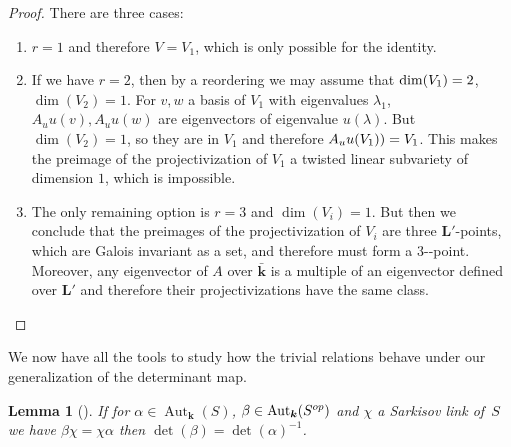 \documentclass[10pt,a4paper]{amsart}
\providecommand{\nobreakdash}{\nobreak\hbox{-}}
\newcommand{\op}{\textup{op}}
\newtheorem{lemma}[theorem]{Lemma}
\theoremstyle{definition}
\newcommand{\kk}{{\boldsymbol{k}}}
\newcommand{\LL}{{\boldsymbol{L}}}
\DeclareMathOperator{\Aut}{Aut}
\begin{document}
\begin{proof}
There are three cases:
\begin{enumerate}
\item $r = 1$ and therefore $V = V_1$, which is only possible for the identity.
\item If we have $r=2$, then by a reordering we may assume that $\dim(V_1) =\nobreak 2$, $\dim(V_2) = 1$. For $v, w$ a basis of $V_1$ with eigenvalues $\lambda_1$, $A_u u(v), A_u u(w)$
are eigenvectors of eigenvalue $u(\lambda)$. But $\dim(V_2) = 1$, so they are in $V_1$ and therefore $A_uu(V_1)) =\nobreak V_1$. This makes the preimage of the projectivization of $V_1$ a twisted linear subvariety of dimension $1$, which is impossible.
\item The only remaining option is $r=3$ and $\dim(V_i) = 1$. But then we conclude that the preimages of the projectivization of $V_i$ are three $\LL'$-points, which are Galois invariant as a set, and therefore must form a $3$\nobreakdash-point. Moreover, any eigenvector of $A$ over $\bar{\kk}$ is a multiple of an eigenvector defined over $\LL'$ and therefore their projectivizations have the same class.\qedhere
\end{enumerate}
\end{proof}

We now have all the tools to study how the trivial relations behave under our generalization of the determinant map.

\begin{lemma}[\cite{BSYUnp}] \label{DetTrivRef}
If for $\alpha \in \Aut_{\kk}(S)$, $\beta \in \Aut_{\kk}(S^{\op})$ and $\chi$ a Sarkisov link of~$S$ we have $\beta \chi = \chi \alpha$ then $\det(\beta) = \det(\alpha)^{-1}$.
\end{lemma}
\end{document}
